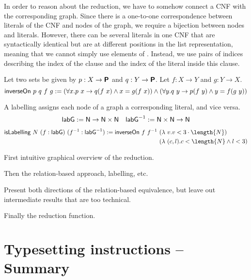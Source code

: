 \documentclass[a4paper,UKenglish,cleveref, autoref]{lipics-v2019}
\begin{document}
In order to reason about the reduction, we have to somehow connect a CNF with the corresponding graph. Since there is a one-to-one correspondence between literals of the CNF and nodes of the graph, we require a bijection between nodes and literals. However, there can be several literals in one CNF that are syntactically identical but are at different positions in the list representation, meaning that we cannot simply use elements of \literal. Instead, we use pairs of indices describing the index of the clause and the index of the literal inside this clause.

\begin{definition}
  Let two sets be given by $p : X \rightarrow \textsf{\bfseries P}$ and $q : Y \rightarrow \textsf{\bfseries P}$. Let $f : X \rightarrow Y$ and $g : Y \rightarrow X$.
  \[\normalfont\textsf{inverseOn}~p~q~f~g := (\forall x. p~x \rightarrow q(f~x) \land x = g(f~x)) \land (\forall y. q~y \rightarrow p(f~y) \land y = f(g~y)) \]
\end{definition}
\begin{definition}
  A labelling assigns each node of a graph a corresponding literal, and vice versa.
  \begin{align*}
  \textsf{labG} := \mathsf{N} \rightarrow \mathsf{N} \times \mathsf{N} && \textsf{labG}^{-1} := \mathsf{N} \times \mathsf{N} \rightarrow \mathsf{N}
  \end{align*}
  \begin{align*}
  \textsf{isLabelling}~N~(f : \textsf{labG})~(f^{-1} : \textsf{labG}^{-1}) := \textsf{inverseOn}~f~f^{-1}~ &(\lambda~v. v < 3 \cdot \length{N})\\
  ~&(\lambda~(c, l). c < \length{N} \land l < 3) 
\end{align*}
\end{definition}


First intuitive graphical overview of the reduction.

Then the relation-based approach, labelling, etc.

Present both directions of the relation-based equivalence, but leave out intermediate results that are too technical.

Finally the reduction function. 

\section{Typesetting instructions -- Summary}
\label{sec:typesetting-summary}
\end{document}
